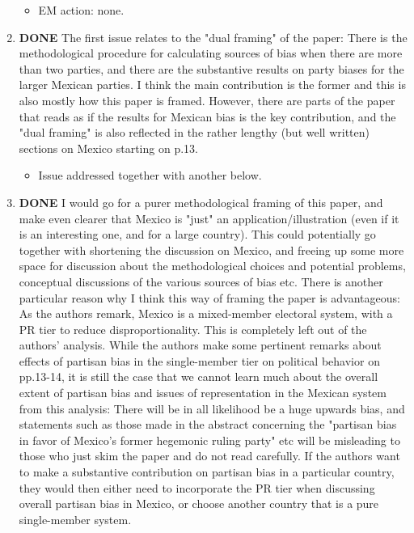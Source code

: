 \documentclass{article}
\begin{document}
\begin{enumerate}
\label{sec:orgheadline4}
\begin{itemize}
\item EM action: none.
\end{itemize}
\item {\bfseries\sffamily DONE} The first issue relates to the "dual framing" of the paper: There is the methodological procedure for calculating sources of bias when there are more than two parties, and there are the substantive results on party biases for the larger Mexican parties. I think the main contribution is the former and this is also mostly how this paper is framed. However, there are parts of the paper that reads as if the results for Mexican bias is the key contribution, and the "dual framing" is also reflected in the rather lengthy (but well written) sections on Mexico starting on p.13.
\label{sec:orgheadline5}
\begin{itemize}
\item Issue addressed together with another below.
\end{itemize}
\item {\bfseries\sffamily DONE} I would go for a purer methodological framing of this paper, and make even clearer that Mexico is "just" an application/illustration (even if it is an interesting one, and for a large country). This could potentially go together with shortening the discussion on Mexico, and  freeing up some more space for discussion about the methodological choices and potential problems, conceptual discussions of the various sources of bias etc. There is another particular reason why I think this way of framing the paper is advantageous: As the authors remark, Mexico is a mixed-member electoral system, with a PR tier to reduce disproportionality. This is completely left out of the authors' analysis. While the authors make some pertinent remarks about effects of partisan bias in the single-member tier on political behavior on pp.13-14, it is still the case that we cannot learn much about the overall extent of partisan bias and issues of representation in the Mexican system from this analysis: There will be in all likelihood be a huge upwards bias, and statements such as those made in the abstract concerning the "partisan bias in favor of Mexico's former hegemonic ruling party" etc will be misleading to those who just skim the paper and do not read carefully. If the authors want to make a substantive contribution on partisan bias in a particular country, they would then either need to incorporate the PR tier when discussing overall partisan bias in Mexico, or choose another country  that is a pure single-member system.

\end{enumerate}
\end{document}
